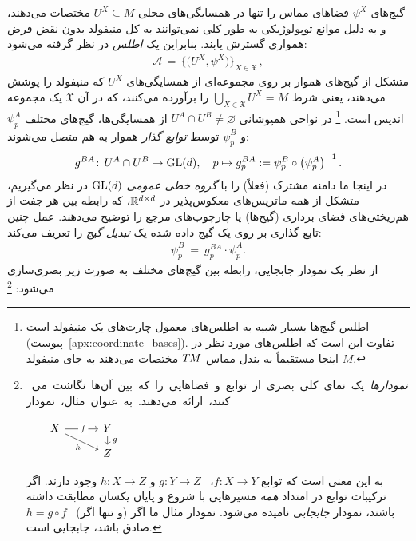 گیج‌های $\psi^X$ فضاهای مماس را تنها در همسایگی‌های محلی $U^X\subseteq M$ مختصات می‌دهند، و به دلیل موانع توپولوژیکی به طور کلی نمی‌توانند به کل منیفولد بدون نقض فرض همواری گسترش یابند.
بنابراین یک \emph{اطلس} در نظر گرفته می‌شود:
\begin{align}
	\mathscr{A} \,=\, \big\{\! \big(U^X, \psi^X\big) \!\big\}_{X\in \mathfrak{X}} \,,
\end{align}
متشکل از گیج‌های هموار بر روی مجموعه‌ای از همسایگی‌های $U^X$ که منیفولد را پوشش می‌دهند، یعنی شرط $\bigcup_{X\in \mathfrak{X}} U^X = M$ را برآورده می‌کنند، که در آن $\mathfrak{X}$ یک مجموعه اندیس است.%
\footnote{
	اطلس گیج‌ها بسیار شبیه به اطلس‌های معمول چارت‌های یک منیفولد است (پیوست~\ref{apx:coordinate_bases}).
	تفاوت این است که اطلس‌های مورد نظر در اینجا مستقیماً به بندل مماس $T\mkern-1.5muM$ مختصات می‌دهند به جای منیفولد $M$.
}
در نواحی همپوشانی $U^A\cap U^B\neq\varnothing$ از همسایگی‌ها، گیج‌های مختلف $\psi_p^A$ و $\psi_p^B$ توسط \emph{توابع گذار} هموار به هم متصل می‌شوند:
\begin{align}\label{eq:transition_fct_local_def_21}
	g^{BA}\!:\, U^A\cap U^B\to\operatorname{GL}(d),\quad p \mapsto g_p^{BA} := \psi_p^B \circ \left(\psi_p^A\right)^{-1}.
\end{align}
در اینجا ما دامنه مشترک (فعلاً) را با \emph{گروه خطی عمومی} $\operatorname{GL}(d)$ در نظر می‌گیریم، متشکل از همه ماتریس‌های معکوس‌پذیر در $ \mathbb{R}^{d\times d}$، که رابطه بین هر جفت از هم‌ریختی‌های فضای برداری (گیج‌ها) یا چارچوب‌های مرجع را توضیح می‌دهند.
عمل چنین تابع گذاری بر روی یک گیج داده شده یک \emph{تبدیل گیج} را تعریف می‌کند:
\begin{align}\label{eq:gauge_trafo_local_def_21}
	\psi_p^B\ =\ g_p^{BA} \!\cdot \psi_p^A.
\end{align}
از نظر یک نمودار جابجایی، رابطه بین گیج‌های مختلف به صورت زیر بصری‌سازی می‌شود:%
\footnote{
	\mbox{
		\emph{نمودارها} یک نمای کلی بصری از توابع و فضاهایی را که بین آن‌ها نگاشت می‌کنند، ارائه می‌دهند.
		به عنوان مثال، نمودار
	}
	\begin{minipage}{.2\textwidth}
		${
			\mkern30mu
			\begin{tikzcd}[column sep=30pt, row sep=8pt, ampersand replacement=\&]
				X
				\arrow[r, pos=.55, "f" description]
				\arrow[rd, "h\!"']
				\& Y
				\arrow[d, "\;g"]
				\\
				\& Z
		\end{tikzcd}}$
	\end{minipage}
	\hfill
	\begin{minipage}{.8\textwidth}
		به این معنی است که توابع $f:X\to Y$، \ $g:Y\to Z$ و $h:X\to Z$ وجود دارند.
		اگر ترکیبات توابع در امتداد \emph{همه} مسیرهایی با شروع و پایان یکسان مطابقت داشته باشند، نمودار \emph{جابجایی} نامیده می‌شود.
		نمودار مثال ما اگر (و تنها اگر) \ $h = g\circ f$ صادق باشد، جابجایی است.
	\end{minipage}
}
